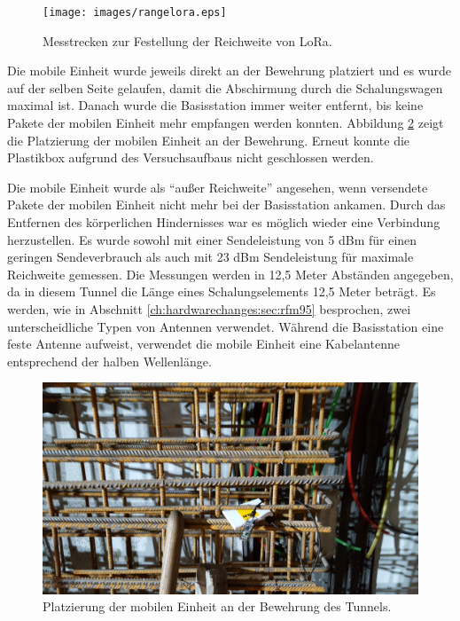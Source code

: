 \begin{figure}[h!]
  \centering
	\texttt{[image: images/rangelora.eps]}
  \caption{Messtrecken zur Festellung der Reichweite von LoRa.}
  \label{fig:rangelora}
\end{figure}

Die mobile Einheit wurde jeweils direkt an der Bewehrung platziert und es wurde auf der selben Seite gelaufen, damit die Abschirmung durch die Schalungswagen maximal ist.
Danach wurde die Basisstation immer weiter entfernt, bis keine Pakete der mobilen Einheit mehr empfangen werden konnten.
Abbildung \ref{fig:lorabasis} zeigt die Platzierung der mobilen Einheit an der Bewehrung.
Erneut konnte die Plastikbox aufgrund des Versuchsaufbaus nicht geschlossen werden.

Die mobile Einheit wurde als "`außer Reichweite"' angesehen, wenn versendete Pakete der mobilen Einheit nicht mehr bei der Basisstation ankamen.
Durch das Entfernen des körperlichen Hindernisses war es möglich wieder eine Verbindung herzustellen.
Es wurde sowohl mit einer Sendeleistung von 5 dBm für einen geringen Sendeverbrauch als auch mit 23 dBm Sendeleistung für maximale Reichweite gemessen.
Die Messungen werden in 12,5 Meter Abständen angegeben, da in diesem Tunnel die Länge eines Schalungselements 12,5 Meter beträgt.
Es werden, wie in Abschnitt \ref{ch:hardwarechanges:sec:rfm95} besprochen, zwei unterscheidliche Typen von Antennen verwendet. 
Während die Basisstation eine feste Antenne aufweist, verwendet die mobile Einheit eine Kabelantenne entsprechend der halben Wellenlänge. 

\begin{figure}[h]
  \centering
	\includegraphics[width=\textwidth]{images/lorabasis.jpg}
  \caption{Platzierung der mobilen Einheit an der Bewehrung des Tunnels.}
  \label{fig:lorabasis}
\end{figure}

